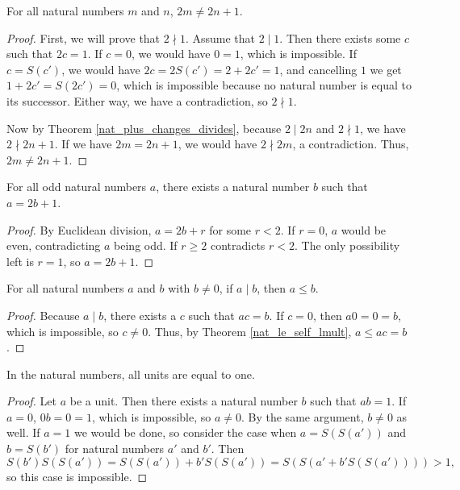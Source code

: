 \documentclass[../../math.tex]{subfiles}
\begin{document}
\begin{theorem} \label{nat_even_neq_odd}
    For all natural numbers $m$ and $n$, $2m \neq 2n + 1$.
\end{theorem}
\begin{proof}
    First, we will prove that $2 \nmid 1$.  Assume that $2 \mid 1$.  Then there
    exists some $c$ such that $2c = 1$.  If $c = 0$, we would have $0 = 1$,
    which is impossible.  If $c = S(c')$, we would have $2c = 2S(c') = 2 + 2c' =
    1$, and cancelling $1$ we get $1 + 2c' = S(2c') = 0$, which is impossible
    because no natural number is equal to its successor.  Either way, we have a
    contradiction, so $2 \nmid 1$.

    Now by Theorem \ref{nat_plus_changes_divides}, because $2 \mid 2n$ and $2
    \nmid 1$, we have $2 \nmid 2n + 1$.  If we have $2m = 2n + 1$, we would have
    $2 \nmid 2m$, a contradiction.  Thus, $2m \neq 2n + 1$.
\end{proof}

\begin{theorem} \label{nat_odd_plus_one}
    For all odd natural numbers $a$, there exists a natural number $b$ such that
    $a = 2b + 1$.
\end{theorem}
\begin{proof}
    By Euclidean division, $a = 2b + r$ for some $r < 2$.  If $r = 0$, $a$ would
    be even, contradicting $a$ being odd.  If $r \geq 2$ contradicts $r < 2$.
    The only possibility left is $r = 1$, so $a = 2b + 1$.
\end{proof}

\begin{theorem} \label{nat_div_le}
    For all natural numbers $a$ and $b$ with $b \neq 0$, if $a \mid b$, then $a
    \leq b$.
\end{theorem}
\begin{proof}
    Because $a \mid b$, there exists a $c$ such that $ac = b$.  If $c = 0$, then
    $a0 = 0 = b$, which is impossible, so $c \neq 0$.  Thus, by Theorem
    \ref{nat_le_self_lmult}, $a \leq ac = b$.
\end{proof}

\begin{theorem} \label{nat_unit}
    In the natural numbers, all units are equal to one.
\end{theorem}
\begin{proof}
    Let $a$ be a unit.  Then there exists a natural number $b$ such that $ab =
    1$.  If $a = 0$, $0b = 0 = 1$, which is impossible, so $a \neq 0$.  By the
    same argument, $b \neq 0$ as well.  If $a = 1$ we would be done, so consider
    the case when $a = S(S(a'))$ and $b = S(b')$ for natural numbers $a'$ and
    $b'$.  Then
    \[
        S(b') S(S(a')) = S(S(a')) + b'S(S(a')) = S(S(a' + b'S(S(a')))) > 1,
    \]
    so this case is impossible.
\end{proof}
\end{document}
